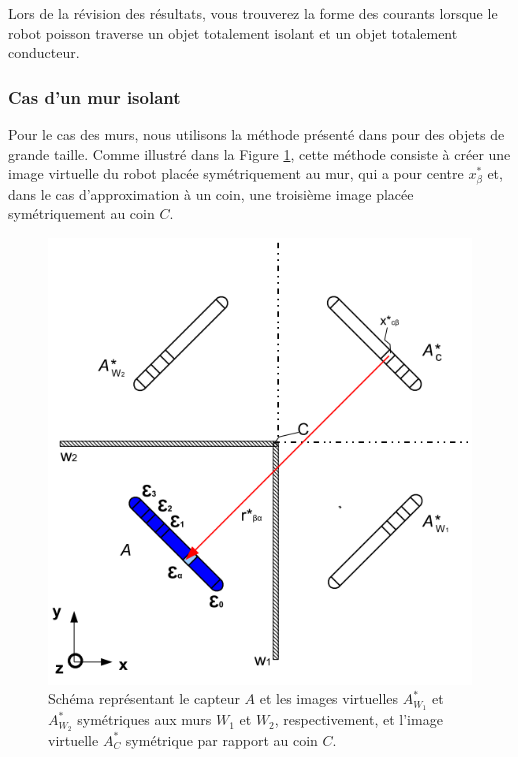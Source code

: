Lors de la révision des résultats, vous trouverez la forme des courants lorsque le robot poisson traverse un objet totalement isolant et un objet totalement conducteur. 

\subsubsection{Cas d'un mur isolant}

Pour le cas des murs, nous utilisons la méthode présenté dans \cite{Jackson2012} pour des objets de grande taille. Comme illustré dans la Figure \ref{fig:schema_murs_coins}, cette méthode consiste à créer une image virtuelle du robot placée symétriquement au mur, qui a pour centre $x_\beta^*$ et, dans le cas d'approximation à un coin, une troisième image placée symétriquement au coin $C$. 

\begin{figure}[h!]
    \centering
    \includegraphics[scale=0.5]{doc/img/schema_murs_coins.png}
    \caption{Schéma représentant le capteur $A$ et les images virtuelles $A_{W_1}^*$ et $A_{W_2}^*$ symétriques aux murs $W_{1}$ et $W_{2}$, respectivement, et l'image virtuelle $A_C^*$ symétrique par rapport au coin $C$. }
    \label{fig:schema_murs_coins}
\end{figure}

